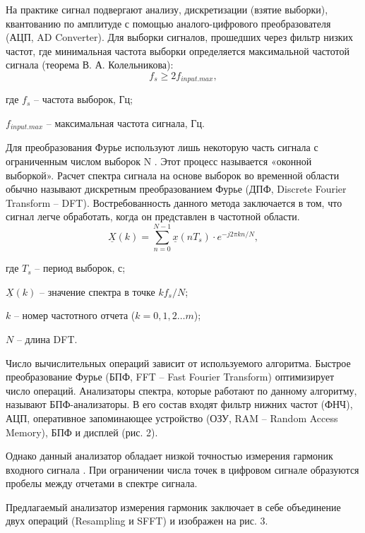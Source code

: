 На практике сигнал подвергают анализу, дискретизации (взятие выборки), квантованию по амплитуде с помощью аналого-цифрового преобразователя (АЦП, AD Converter). Для выборки сигналов, прошедших 
через фильтр низких частот, где минимальная частота выборки определяется максимальной частотой сигнала (теорема В. А. Колельникова): 
\begin{equation}
 \label{eq:equation1}
 f_s \geqslant 2f_{input.max},
\end{equation}

где $f_s$ – частота выборок, Гц;

$f_{input.max}$ – максимальная частота сигнала, Гц.

Для преобразования Фурье используют лишь некоторую часть сигнала с 
ограниченным числом выборок 
N . Этот процесс называется «оконной 
выборкой».
Расчет спектра сигнала на основе выборок во временной области обычно 
называют дискретным преобразованием Фурье (ДПФ, Discrete Fourier 
Transform – DFT). Востребованность данного метода заключается в том, что 
сигнал легче обработать, когда он представлен в частотной области.
\begin{equation}
\label{eq:equation1}
	\underline{X}(k) = \sum^{N-1}_{n=0} \underline{x}(nT_s) \cdot e^{-j2 \pi kn/N},
\end{equation}

где $T_s$  – период выборок, с;

$\underline{X}(k)$ –  значение спектра в точке $kf_s/N$;

$k$ – номер частотного отчета ($k=0,1,2\ldots m$);

$N$ – длина DFT.

Число вычислительных операций зависит от используемого алгоритма. Быстрое преобразование Фурье (БПФ, FFT – Fast Fourier Transform) оптимизирует число операций. Анализаторы спектра, которые работают по 
данному алгоритму, называют БПФ-анализаторы. В его состав входят фильтр нижних частот (ФНЧ), АЦП, оперативное запоминающее устройство (ОЗУ, RAM – Random Access Memory), БПФ и дисплей (рис. 2). 

Однако данный анализатор обладает низкой точностью измерения гармоник входного сигнала \cite{Rauscher2006basics}.
При ограничении числа точек в цифровом сигнале образуются пробелы между отчетами в спектре сигнала.

Предлагаемый анализатор измерения гармоник заключает в себе объединение двух операций (Resampling и SFFT) и изображен на рис. 3.

